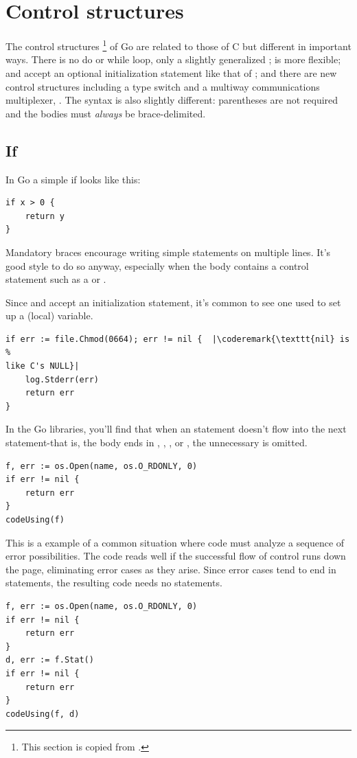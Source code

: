 \section{Control structures}
The control structures
\footnote{This section is copied from \cite{effective_go}.} 
of Go are related to those of C but different in
important ways. There is no do or while loop, only a slightly
generalized ;  is more flexible;  and
 accept an
optional initialization statement like that of ; and there are new
control structures including a type switch and a multiway communications
multiplexer, . The syntax is also slightly different: parentheses
are not required and the bodies must \emph{always} be brace-delimited.

\subsection{If}
In Go a simple if looks like this:
\begin{lstlisting}
if x > 0 {
    return y
}
\end{lstlisting}
Mandatory braces encourage writing simple  statements on multiple
lines. It's good style to do so anyway, especially when the body
contains a control statement such as a  or .

Since  and  accept an initialization statement, it's common to
see one used to set up a (local) variable.
\begin{lstlisting}
if err := file.Chmod(0664); err != nil {  |\coderemark{\texttt{nil} is %
like C's NULL}|
    log.Stderr(err)
    return err
}
\end{lstlisting}
In the Go libraries, you'll find that when an  statement doesn't flow
into the next statement-that is, the body ends in ,
, ,
or , the unnecessary  is omitted.

\begin{lstlisting}
f, err := os.Open(name, os.O_RDONLY, 0)
if err != nil {
    return err
}
codeUsing(f)
\end{lstlisting}
This is a example of a common situation where code must analyze a
sequence of error possibilities. The code reads well if the successful
flow of control runs down the page, eliminating error cases as they
arise. Since error cases tend to end in  statements, the resulting
code needs no  statements.
\begin{lstlisting}
f, err := os.Open(name, os.O_RDONLY, 0)
if err != nil {
    return err
}
d, err := f.Stat()
if err != nil {
    return err
}
codeUsing(f, d)
\end{lstlisting}

